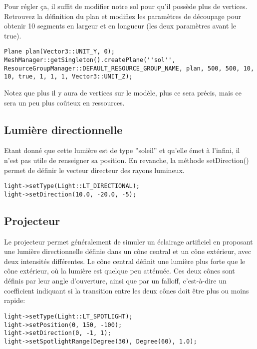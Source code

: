 Pour r\'egler \c{c}a, il suffit de modifier notre sol pour qu'il poss\`ede plus de vertices. Retrouvez la d\'efinition du plan et modifiez les param\`etres de d\'ecoupage pour obtenir 10 segments en largeur et en longueur (les deux param\`etres avant le true).

\begin{lstlisting}
Plane plan(Vector3::UNIT_Y, 0);
MeshManager::getSingleton().createPlane(''sol'', ResourceGroupManager::DEFAULT_RESOURCE_GROUP_NAME, plan, 500, 500, 10, 10, true, 1, 1, 1, Vector3::UNIT_Z);
\end{lstlisting}



Notez que plus il y aura de vertices sur le mod\`ele, plus ce sera pr\'ecis, mais ce sera un peu plus co\^uteux en ressources.




\subsection{Lumi\`ere directionnelle}

Etant donn\'e que cette lumi\`ere est de type ''soleil'' et qu'elle \'emet \`{a} l'infini, il n'est pas utile de renseigner sa position. En revanche, la m\'ethode setDirection() permet de d\'efinir le vecteur directeur des rayons lumineux.

\begin{lstlisting}
light->setType(Light::LT_DIRECTIONAL);
light->setDirection(10.0, -20.0, -5);
\end{lstlisting}






\subsection{Projecteur}

Le projecteur permet g\'en\'eralement de simuler un \'eclairage artificiel en proposant une lumi\`ere directionnelle d\'efinie dans un c\^one central et un c\^one ext\'erieur, avec deux intensit\'es diff\'erentes. Le c\^one central d\'efinit une lumi\`ere plus forte que le c\^one ext\'erieur, o\`{u} la lumi\`ere est quelque peu att\'enu\'ee. Ces deux c\^ones sont d\'efinis par leur angle d'ouverture, ainsi que par un falloff, c'est-\`{a}-dire un coefficient indiquant si la transition entre les deux c\^ones doit \^etre plus ou moins rapide:
\begin{lstlisting}
light->setType(Light::LT_SPOTLIGHT);
light->setPosition(0, 150, -100);
light->setDirection(0, -1, 1);
light->setSpotlightRange(Degree(30), Degree(60), 1.0);
\end{lstlisting}


